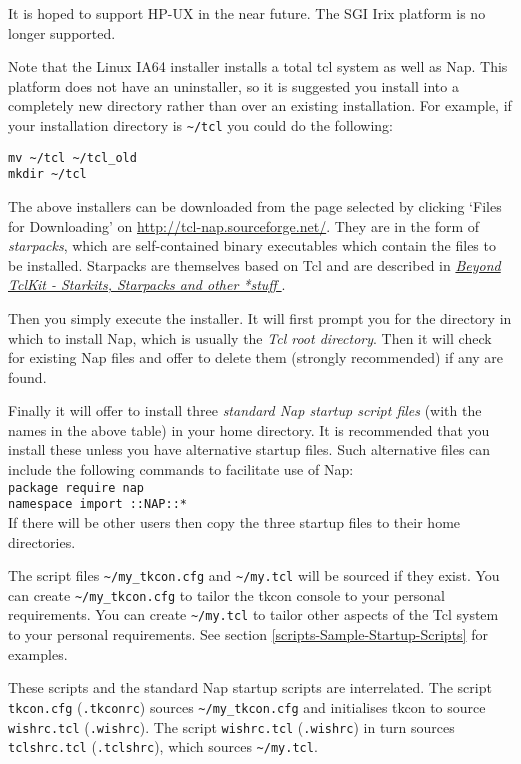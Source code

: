  It is hoped to support HP-UX in the near future. The SGI Irix
  platform is no longer supported.
  
 Note that the Linux IA64 installer installs a total tcl system as
  well as Nap. This platform does not have an uninstaller, so it is
  suggested you install into a completely new directory rather than
  over an existing installation. 
For example, if your installation directory is 
\verb!~/tcl! you could do the following:
  \begin{verbatim}
mv ~/tcl ~/tcl_old
mkdir ~/tcl
\end{verbatim}
  
 The above installers can be downloaded from the page selected by clicking
 `Files for Downloading'  on
  \href{http://tcl-nap.sourceforge.net/}
  {http://tcl-nap.sourceforge.net/}.
They are in the form of 
  \emph{starpacks}, which are self-contained binary executables which
  contain the files to be installed. Starpacks are themselves based on
  Tcl and are described in 
  \href{http://www.equi4.com/papers/skpaper1.html}{ \emph{Beyond TclKit - Starkits, Starpacks and other *stuff} }.
  
 Then you simply execute the installer. It will first prompt you
  for the directory in which to install Nap, which is usually the 
  \emph{Tcl root directory}. Then it will check for existing Nap
  files and offer to delete them (strongly recommended) if any are
  found.
  
 Finally it will offer to install three 
  \emph{standard Nap startup script files} (with the names in the
  above table) in your home directory. It is recommended that you
  install these unless you have alternative startup files. Such
  alternative files can include the following commands to facilitate
  use of Nap: 
  \texttt{
  \\package require nap
  \\namespace import ::NAP::*}
  \\If there will be other users then copy the three startup files
  to their home directories.
  
 The script files 
  \verb!~/my_tkcon.cfg! and 
  \verb!~/my.tcl! will be sourced if they exist. You can create 
  \verb!~/my_tkcon.cfg! to tailor the tkcon console to your
  personal requirements. You can create 
  \verb!~/my.tcl! to tailor other aspects of the Tcl system to
  your personal requirements. See section
  \ref{scripts-Sample-Startup-Scripts}
for examples.
  
 These scripts and the standard Nap startup scripts are
  interrelated. The script 
  \texttt{tkcon.cfg} (\texttt{.tkconrc}) sources 
  \verb!~/my_tkcon.cfg! and initialises tkcon to source 
  \texttt{wishrc.tcl} (\texttt{.wishrc}). The script 
  \texttt{wishrc.tcl} (\texttt{.wishrc}) in turn sources 
  \texttt{tclshrc.tcl} (\texttt{.tclshrc}), which sources 
  \verb!~/my.tcl!.
  

